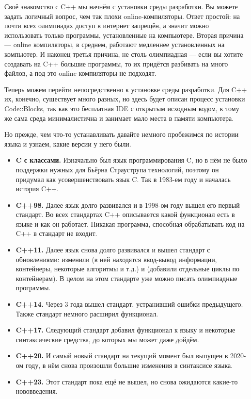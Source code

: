 Своё знакомство с C++ мы начнём с установки среды разработки. Вы можете задать логичный вопрос, чем так плохи online-компиляторы. Ответ простой: на почти всех олимпиадах доступ в интернет запрещён, а значит можно использовать только программы, установленные на компьютере. Вторая причина — online компиляторы, в среднем, работают медленнее установленных на компьютер. И наконец третья причина, не столь олимпиадная — если вы хотите создавать на C++ большие программы, то их придётся разбивать на много файлов, а под это online-компиляторы не подходят.

Теперь можем перейти непосредственно к установке среды разработки. Для C++ их, конечно, существует много разных, но здесь будет описан процесс установки Code::Blocks, так как это бесплатная IDE с открытым исходным кодом, к тому же сама среда минималистична и занимает мало места в памяти компьютера.

Но прежде, чем что-то устанавливать давайте немного пробежимся по истории языка и узнаем, какие версии у него были. 

\begin{itemize}
    \item \textbf{C с классами.} Изначально был язык программирования C, но в нём не было поддержки нужных для Бьёрна Страуструпа технологий, поэтому он придумал как усовершенствовать язык C. Так в 1983-ем году и началась история C++.
    \item \textbf{C++98.} Далее язык долго развивался и в 1998-ом году вышел его первый стандарт. Во всех стандартах C++ описывается какой функционал есть в языке и как он работает. Никакая программа, способная обрабатывать код на C++ в стандарт не входит.
    \item \textbf{C++11.} Далее язык снова долго развивался и вышел стандарт с обновлениями: изменили  (в ней находятся ввод-вывод информации, контейнеры, некоторые алгоритмы и т.д.) и  (добавили отдельные циклы по контейнерам). В целом на этом стандарте уже можно писать олимпиадные программы.
    \item \textbf{C++14.} Через 3 года вышел стандарт, устранивший ошибки предыдущего. Также стандарт немного расширил функционал.
    \item \textbf{C++17.} Следующий стандарт добавил функционал к языку и некоторые синтаксические средства, до которых мы может даже дойдём.
    \item \textbf{C++20.} И самый новый стандарт на текущий момент был выпущен в 2020-ом году, в нём снова произошли большие изменения в синтаксисе языка.
    \item \textbf{C++23.} Этот стандарт пока ещё не вышел, но снова ожидаются какие-то нововведения.
\end{itemize}

